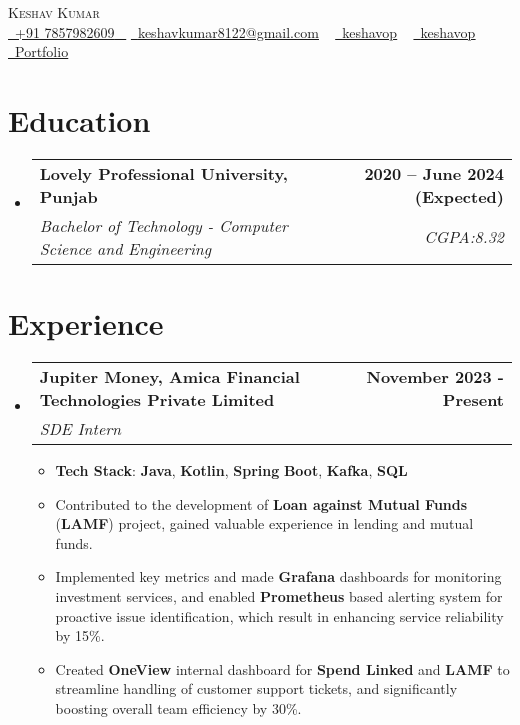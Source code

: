 \documentclass[letterpaper,11pt]{article}
\makeatletter
\newcommand{\resumeItem}[1]{
  \item\small{
    {#1 \vspace{-2pt}}
  }
}
\newcommand{\resumeSubheading}[4]{
  \vspace{-2pt}\item
    \begin{tabular*}{1.0\textwidth}[t]{l@{\extracolsep{\fill}}r}
      \textbf{\large#1} & \textbf{\small #2} \\
      \textit{\large#3} & \textit{\small #4} \\
      
    \end{tabular*}\vspace{-7pt}
}
\newcommand{\resumeSubHeadingListStart}{\begin{itemize}[leftmargin=0.0in, label={}]}
\newcommand{\resumeSubHeadingListEnd}{\end{itemize}}
\newcommand{\resumeItemListStart}{\begin{itemize}}
\newcommand{\resumeItemListEnd}{\end{itemize}\vspace{-5pt}}
\makeatother
\begin{document}


\begin{center}
    {\Huge \scshape Keshav Kumar} \\ \vspace{10pt}
    \small \href{phone:7857982609}{ \raisebox{-0.1\height}\faPhone\ \underline{+91 7857982609} ~} \href{mailto:keshavkumar8122@gmail.com}{\raisebox{-0.2\height}\faEnvelope\  \underline{keshavkumar8122@gmail.com}} ~ 
    \href{https://www.linkedin.com/in/keshavkumar3/}{\raisebox{-0.2\height}\faLinkedinSquare\ \underline{keshavop}}  ~
    \href{https://github.com/Keshavop}{\raisebox{-0.2\height}\faGithub\ \underline{keshavop}} ~
    \href{https://keshavop.vercel.app}{\raisebox{-0.2\height}\faUser\ \underline{Portfolio}} ~
    \vspace{-4pt}
\end{center}


\section{Education}
  \resumeSubHeadingListStart
    \resumeSubheading
      {Lovely Professional University, Punjab}{2020 -- June 2024 (Expected)}
      {Bachelor of Technology - Computer Science and Engineering  \textbf{} \textbf{}}{CGPA:8.32}
  \resumeSubHeadingListEnd

\vspace{-3pt}

\section{Experience}
  \resumeSubHeadingListStart
    \resumeSubheading
      {Jupiter Money, Amica Financial Technologies Private Limited}{November 2023 - Present}
      {SDE Intern}{}
      \resumeItemListStart
        \item{
        \textbf{Tech Stack}: \textbf{Java}, \textbf{Kotlin}, \textbf{Spring} \textbf{Boot}, \textbf{Kafka}, \textbf{SQL} \\
        }
        \resumeItem{Contributed to the development of \textbf{Loan against Mutual Funds} (\textbf{LAMF}) project, gained valuable experience in lending and mutual funds.}
        \resumeItem{Implemented key metrics and made \textbf{Grafana} dashboards for monitoring investment services, and enabled \textbf{Prometheus} based alerting system for proactive issue identification, which result in enhancing service reliability by 15\%.}
        \resumeItem{Created \textbf{OneView} internal dashboard for \textbf{Spend Linked} and \textbf{LAMF} to streamline handling of customer support tickets,  and significantly boosting overall team efficiency by 30\%.}
      \resumeItemListEnd 
  \resumeSubHeadingListEnd
\end{document}
